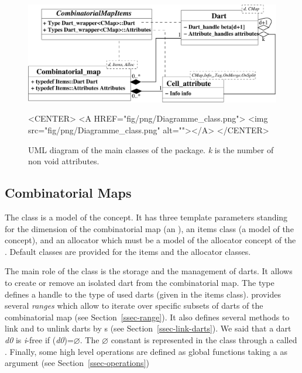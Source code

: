 \begin{figure}
  \begin{ccTexOnly}
    \begin{center}
      \includegraphics[width=.95\textwidth]
      {Combinatorial_map/fig/pdf/Diagramme_class}
    \end{center}
  \end{ccTexOnly}
  \begin{ccHtmlOnly}
    <CENTER>
    <A HREF="fig/png/Diagramme_class.png">
        <img src="fig/png/Diagramme_class.png" alt=""></A>
    </CENTER>
    \end{ccHtmlOnly}
    \caption{UML diagram of the main classes of the package. \emph{k} is the number of
      non void attributes.}
    \label{fig-diagram_class}
\end{figure}

\subsection{Combinatorial Maps}\label{ssec-combinatorial-map}

The class  is a model of the
 concept.  It has three template parameters
standing for the dimension of the combinatorial map (an 
), an items class (a model of the 
concept), and an allocator which must be a model of the allocator
concept of the {\stl}.  Default classes are provided for the items and
the allocator classes.

The main role of the class  is the storage and
the management of darts. It allows to create or remove an isolated
dart from the combinatorial map.  The  type defines a
handle to the type of used darts (given in the items class).
 provides several \emph{ranges} which allow to
iterate over specific subsets of darts of the combinatorial map (see
Section~\ref{ssec-range}).  It also defines several methods to link
and to unlink darts by \betai{}s (see
Section~\ref{ssec-link-darts}). We said that a dart \emph{d0} is \emph{i}-free 
if \betai{}(\emph{d0})=$\varnothing$.   The $\varnothing$ constant is
represented in the class  through a 
called \nulldart{}.  Finally, some high level
operations are defined as global functions taking a
 as argument (see
Section~\ref{ssec-operations})

